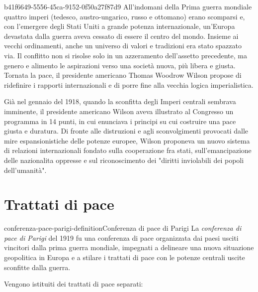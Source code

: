 \documentclass[preview]{standalone}
\begin{document}
\begin{snippet}{b41f6649-5556-45ca-9152-0f50a27f87d9}
    All'indomani della Prima guerra mondiale quattro imperi (tedesco, austro-ungarico, russo e
    ottomano) erano scomparsi e, con l'emergere degli Stati Uniti a grande potenza internazionale,
    un'Europa devastata dalla guerra aveva cessato di essere il centro del mondo. Insieme ai vecchi
    ordinamenti, anche un universo di valori e tradizioni era stato spazzato via. Il conflitto non si
    risolse solo in un azzeramento dell'assetto precedente, ma genero e alimento le aspirazioni
    verso una società nuova, più libera e giusta. Tornata la pace, il presidente americano Thomas
    Woodrow Wilson propose di ridefinire i rapporti internazionali e di porre fine alla vecchia
    logica imperialistica.
    
    Già nel gennaio del 1918, quando la sconfitta degli Imperi centrali sembrava imminente, il
    presidente americano Wilson aveva illustrato al Congresso un programma in 14 punti, in cui
    enunciava i principi su cui costruire una pace giusta e duratura. Di fronte alle distruzioni e agli
    sconvolgimenti provocati dalle mire espansionistiche delle potenze europee, Wilson proponeva
    un nuovo sistema di relazioni internazionali fondato sulla cooperazione fra stati,
    sull'emancipazione delle nazionalita oppresse e sul riconoscimento dei "diritti inviolabili dei
    popoli dell'umanità".
    
\end{snippet}

\section{Trattati di pace}

\begin{snippetdefinition}{conferenza-pace-parigi-definition}{Conferenza di pace di Parigi}
    La \textit{conferenza di pace di Parigi} del 1919 fu una conferenza di
    pace organizzata dai paesi usciti vincitori dalla prima guerra mondiale,
    impegnati a delineare una nuova situazione geopolitica in Europa e a
    stilare i trattati di pace con le potenze centrali uscite sconfitte dalla guerra. 
\end{snippetdefinition}

\begin{plainhtml}
    Vengono istituiti dei trattati di pace separati:
\end{plainhtml}

\end{document}
